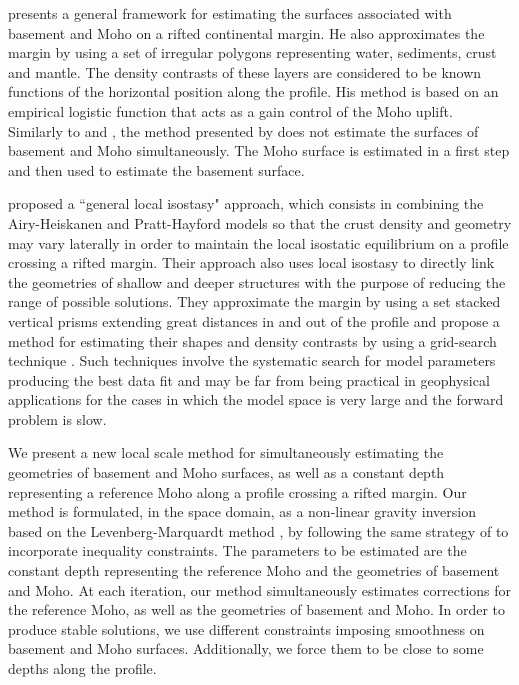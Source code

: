 \documentclass[manuscript]{geophysics}
\begin{document}
\citet{salem2017} presents a general framework for estimating the surfaces associated with
basement and Moho on a rifted continental margin.
He also approximates the margin by using a set of irregular polygons
representing water, sediments, crust and mantle.
The density contrasts of these layers are considered to be known functions
of the horizontal position along the profile.
His method is based on an empirical logistic function that acts as a gain control of the 
Moho uplift.
Similarly to \citet{salem-etal2014} and \citet{garcia-abdeslem2017}, the method presented
by \citet{salem2017} does not estimate the surfaces of basement and Moho simultaneously.
The Moho surface is estimated in a first step and then used to estimate the basement surface.

\citet{ferderer-etal2017} proposed a ``general local isostasy" approach, which consists
in combining the Airy-Heiskanen and Pratt-Hayford models \citep{heiskanen-moritz1967} 
so that the crust density and geometry 
may vary laterally in order to maintain the local isostatic equilibrium on a profile crossing
a rifted margin. Their approach also uses local isostasy to directly link the geometries
of shallow and deeper structures with the purpose of reducing the range of possible solutions.
They approximate the margin by using a set stacked vertical prisms extending great distances in
and out of the profile and propose a method for estimating their shapes and density contrasts by
using a grid-search technique \citep{sen-stoffa2013}.
Such techniques involve the systematic search for model parameters producing the best data fit
and may be far from being practical in geophysical applications for the cases in which
the model space is very large and the forward problem is slow.

We present a new local scale method for simultaneously estimating the geometries
of basement and Moho surfaces, as well as a constant depth representing a reference Moho
along a profile crossing a rifted margin.
Our method is formulated, in the space domain, as a non-linear gravity inversion
based on the Levenberg-Marquardt method \citep{silva-etal2001, aster-etal2005}, 
by following the same strategy of \citet{barbosa-etal1999} to incorporate
inequality constraints.
The parameters to be estimated are the constant depth representing the
reference Moho and the geometries of basement and Moho.
At each iteration, our method simultaneously estimates corrections for the 
reference Moho, as well as the geometries of basement and Moho. 
In order to produce stable solutions, we use different constraints imposing 
smoothness on basement and Moho surfaces. Additionally, we force them to be 
close to some depths along the profile. 
\end{document}
